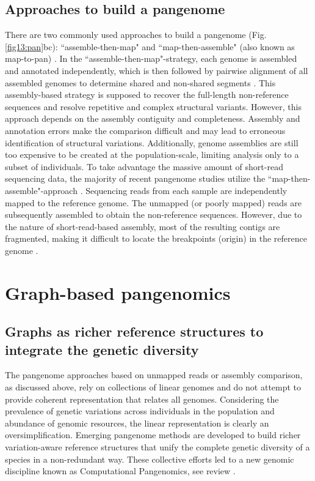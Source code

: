 \documentclass[../main.tex]{subfiles}
\begin{document}
\subsection*{Approaches to build a pangenome}
There are two commonly used approaches to build a pangenome (Fig. \ref{fig13:pan}bc): “assemble-then-map" and “map-then-assemble" (also known as map-to-pan) \citep{golicz2020pangenomics}. In the “assemble-then-map"-strategy, each genome is assembled and annotated independently, which is then followed by pairwise alignment of all assembled genomes to determine shared and non-shared segments \citep{duan2019hupan,li2019towards,eisfeldt2020discovery}. This assembly-based strategy is supposed to recover the full-length non-reference sequences and resolve repetitive and complex structural variants. However, this approach depends on the assembly contiguity and completeness. Assembly and annotation errors make the comparison difficult and may lead to erroneous identification of structural variations. Additionally, genome assemblies are still too expensive to be created at the population-scale, limiting analysis only to a subset of individuals. To take advantage the massive amount of short-read sequencing data, the majority of  recent pangenome studies utilize the “map-then-assemble"-approach \citep{holden2018assembly,laine2019exploring,sherman2019assembly}. Sequencing reads from each sample are independently mapped to the reference genome. The  unmapped (or poorly mapped) reads are subsequently assembled to obtain the non-reference sequences. However, due to the nature of short-read-based assembly, most of the resulting contigs are fragmented, making it difficult to locate the breakpoints (origin) in the reference genome \citep{sherman2019assembly}. 

\section{Graph-based pangenomics}

\subsection*{Graphs as richer reference structures to integrate the genetic diversity}

The pangenome approaches based on unmapped reads or assembly comparison, as discussed above, rely on collections of linear genomes and do not attempt to provide coherent representation that relates all genomes. Considering the prevalence of genetic variations across individuals in the population and abundance of genomic resources, the linear representation is clearly an oversimplification. Emerging pangenome methods are developed to build richer variation-aware reference structures that unify the complete genetic diversity of a species in a non-redundant way. These collective efforts led to a new genomic discipline known as Computational Pangenomics, see review \citep{paten2017genome,computational2018computational,eizenga2020pangenome}.
\end{document}
